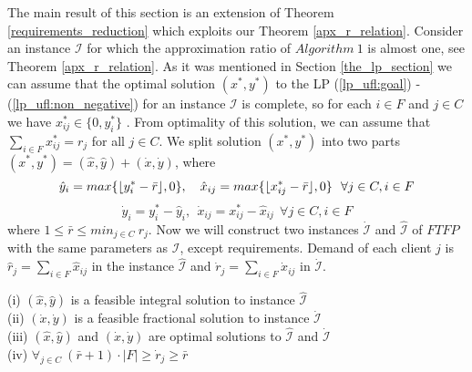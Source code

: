 \documentclass{llncs}
\DeclarePairedDelimiter{\floor}{\lfloor}{\rfloor}
\begin{document}
The main result of this section is an extension of Theorem \ref{requirements_reduction} which exploits our Theorem \ref{apx_r_relation}. Consider an instance $\mathcal{I}$ for which the approximation ratio of $Algorithm~1$ is almost one, see Theorem \ref{apx_r_relation}. As it was mentioned in Section \ref{the_lp_section} we can assume that the optimal solution $(x^*, y^*)$ to the LP (\ref{lp_ufl:goal}) - (\ref{lp_ufl:non_negative}) for an instance $\mathcal{I}$ is complete, so for each $i \in F$ and $j \in C$ we have $x_{ij}^* \in \{0, y_i^*\}$ . From optimality of this solution, we can assume that $\sum_{i \in F}x_{ij}^* = r_j$ for all $j \in C$. We split solution $(x^*, y^*)$ into two parts $(x^*, y^*) = (\hat{x}, \hat{y}) + (\dot x, \dot y)$, where 
$$\hat{y}_i = max\{\floor{y_i^* - \bar r}, 0\},~~~\hat{x}_{ij} = max\{\floor{x_{ij}^* - \bar r}, 0\}~~\forall j \in C, i \in F$$
$$\dot y_i = y_i^* - \hat{y}_i,~~\dot x_{ij} = x_{ij}^* - \hat{x}_{ij}~~\forall j \in C, i \in F$$
where $1 \leq \bar r \leq min_{j \in C}~r_j$. Now we will construct two instances $\mathcal{\dot I}$ and $\hat{\mathcal{I}}$ of $FTFP$ with the same parameters as $\mathcal{I}$, except requirements. Demand of each client $j$ is $\hat{r}_j = \sum_{i \in F} \hat{x}_{ij}$ in the instance $\hat{\mathcal{I}}$ and $\dot r_j = \sum_{i \in F} \dot x_{ij}$ in $\mathcal{\dot I}$.

\begin{lemma}
 (i) $(\hat{x}, \hat{y})$ is a feasible integral solution to instance $\hat{\mathcal{I}}$ \\
 (ii) $(\dot x, \dot y)$ is a feasible fractional solution to instance $\mathcal{\dot I}$ \\
 (iii) $(\hat{x}, \hat{y})$ and $(\dot x, \dot y)$ are optimal solutions to $\mathcal{\hat I}$ and $\mathcal{\dot I}$ \\
 (iv) $\forall_{j \in C}~ (\bar r + 1) \cdot |F| \geq \dot r_j \geq \bar r$
\end{lemma}
\end{document}
